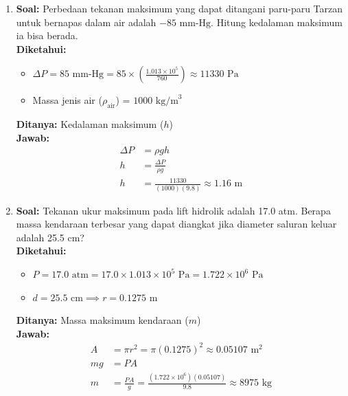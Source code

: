 \documentclass[twocolumn]{article}
\begin{document}
\begin{enumerate}
    \item \textbf{Soal:} Perbedaan tekanan maksimum yang dapat ditangani paru-paru Tarzan untuk bernapas dalam air adalah $-85 \text{ mm-Hg}$. Hitung kedalaman maksimum ia bisa berada. \\
    \textbf{Diketahui:}
    \begin{itemize}
        \item $\Delta P = 85 \text{ mm-Hg} = 85 \times \left(\frac{1.013 \times 10^5}{760}\right) \approx 11330 \text{ Pa}$
        \item Massa jenis air ($\rho_{\text{air}}$) = $1000 \text{ kg/m}^3$
    \end{itemize}
    \textbf{Ditanya:} Kedalaman maksimum ($h$) \\
    \textbf{Jawab:}
    \begin{align*}
        \Delta P &= \rho g h \\
        h &= \frac{\Delta P}{\rho g} \\
        h &= \frac{11330}{(1000)(9.8)} \approx 1.16 \text{ m}
    \end{align*}

    \item \textbf{Soal:} Tekanan ukur maksimum pada lift hidrolik adalah 17.0 atm. Berapa massa kendaraan terbesar yang dapat diangkat jika diameter saluran keluar adalah 25.5 cm? \\
    \textbf{Diketahui:}
    \begin{itemize}
        \item $P = 17.0 \text{ atm} = 17.0 \times 1.013 \times 10^5 \text{ Pa} = 1.722 \times 10^6 \text{ Pa}$
        \item $d = 25.5 \text{ cm} \implies r = 0.1275 \text{ m}$
    \end{itemize}
    \textbf{Ditanya:} Massa maksimum kendaraan ($m$) \\
    \textbf{Jawab:}
    \begin{align*}
        A &= \pi r^2 = \pi (0.1275)^2 \approx 0.05107 \text{ m}^2 \\
        mg &= P A \\
        m &= \frac{PA}{g} = \frac{(1.722 \times 10^6)(0.05107)}{9.8} \approx 8975 \text{ kg}
    \end{align*}


\end{enumerate}
\end{document}
